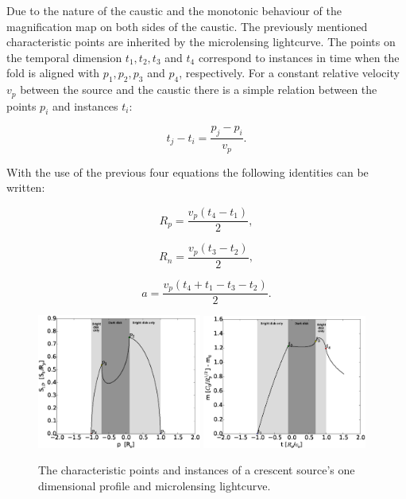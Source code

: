 \documentclass[usenatbib]{mn2e}
\begin{document}
Due to the nature of the caustic and the monotonic behaviour of the magnification map on both sides of the caustic. The previously mentioned characteristic points are inherited by the microlensing lightcurve. The points on the temporal dimension $t_1, t_2, t_3$ and $t_4$ correspond to instances in time when the fold is aligned with $p_1, p_2, p_3$ and $p_4$, respectively. For a constant relative velocity $v_p$ between the source and the caustic there is a simple relation between the points $p_i$ and instances $t_i$:

\begin{equation}
	t_j - t_i = \frac{p_j - p_i}{v_p}.
\end{equation}

With the use of the previous four equations the following identities can be written:

\begin{equation}
	R_p = \frac{v_p \left( t_4 -t_1 \right)}{2}, 
\end{equation}

\begin{equation}
        R_n = \frac{v_p \left( t_3 -t_2 \right)}{2}, 
\end{equation}

\begin{equation}
        a = \frac{v_p \left( t_4 +t_1 - t_3 - t_2 \right)}{2}. 
\end{equation}



\begin{figure}
\centering
	\includegraphics[width = 0.48\textwidth]{figures/ch_points.eps}
        \includegraphics[width = 0.48\textwidth]{figures/ch_instances.eps}
\caption{\label{fig:char_points} The characteristic points and instances of a crescent source's one dimensional profile and microlensing lightcurve. }
\end{figure}
\end{document}
